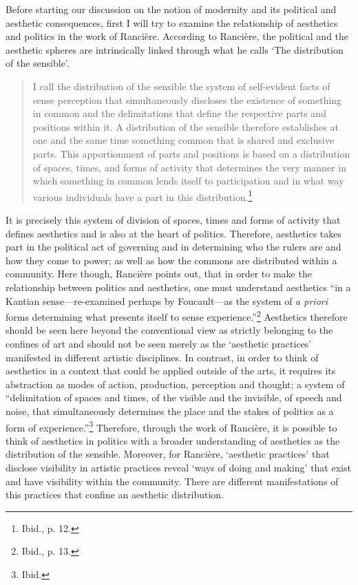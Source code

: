 Before starting our discussion on the notion of modernity and its political and aesthetic consequences, first I will try to examine the relationship of aesthetics and politics in the work of Ranci\`{e}re. According to Ranci\`{e}re, the political and the aesthetic spheres are intrinsically linked through what he calls `The distribution of the sensible'. 
\begin{quote}
I call the distribution of the sensible the system of self-evident facts of sense perception that simultaneously discloses the existence of something in common and the delimitations that define the respective parts and positions within it. A distribution of the sensible therefore establishes at one and the same time something common that is shared and exclusive parts. This apportionment of parts and positions is based on a distribution of spaces, times, and forms of activity that determines the very manner in which something in common lends itself to participation and in what way various individuals have a part in this distribution.\footnote{Ibid., p. 12.}
\end{quote}
It is precisely this system of division of spaces, times and forms of activity that defines aesthetics and is also at the heart of politics. Therefore, aesthetics takes part in the political act of governing and in determining who the rulers are and how they come to power; as well as how the commons are distributed within a community. Here though, Ranci\`{e}re points out, that in order to make the relationship between politics and aesthetics, one must understand aesthetics ``in a Kantian sense---re-examined perhaps by Foucault---as the system of \emph{a priori} forms determining what presents itself to sense experience.''\footnote{Ibid., p. 13.} Aesthetics therefore should be seen here beyond the conventional view as strictly belonging to the confines of art and should not be seen merely as the `aesthetic practices' manifested in different artistic disciplines.  In contrast, in order to think of aesthetics in a context that could be applied outside of the arts, it requires its abstraction as modes of action, production, perception and thought; a system of ``delimitation of spaces and times, of the visible and the invisible, of speech and noise, that simultaneously determines the place and the stakes of politics as a form of experience.''\footnote{Ibid.}
Therefore, through the work of Ranci\`{e}re, it is possible to think of aesthetics in politics with a broader understanding of aesthetics as the distribution of the sensible. Moreover, for Ranci\`{e}re, `aesthetic practices' that disclose visibility in artistic practices reveal `ways of doing and making' that exist and have visibility within the community. There are different manifestations of this practices that confine an aesthetic distribution.

